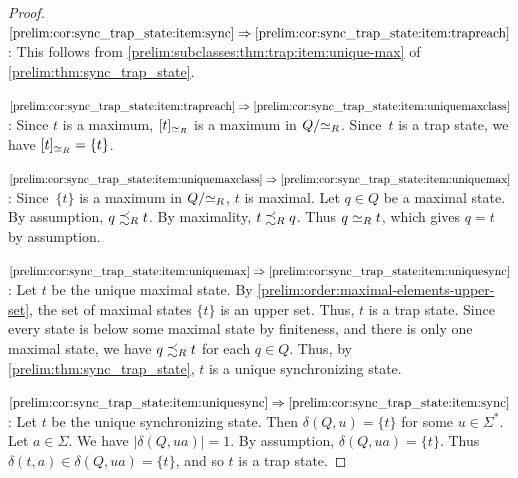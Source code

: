\begin{proof}
$\ref{prelim:cor:sync_trap_state:item:sync}\Rightarrow \ref{prelim:cor:sync_trap_state:item:trapreach}$: This follows from \cref{prelim:subclasses:thm:trap:item:unique-max} of \cref{prelim:thm:sync_trap_state}.

$\ref{prelim:cor:sync_trap_state:item:trapreach}\Rightarrow \ref{prelim:cor:sync_trap_state:item:uniquemaxclass}$: Since $t$ is a maximum, $[t]_{\simeq_R}$ is a maximum in $Q / {\simeq_R}$.
 Since~$t$ is a trap state, we have $[t]_{\simeq_R} = \{t\}$.

$\ref{prelim:cor:sync_trap_state:item:uniquemaxclass}\Rightarrow \ref{prelim:cor:sync_trap_state:item:uniquemax}$: Since~$\{t\}$
is a maximum in $Q / {\simeq_R}$, $t$ is maximal.
Let $q \in Q$ be a maximal state. By assumption, $q \precsim_R t$.
 By maximality, $t \precsim_R q$. Thus $q \simeq_R t$, which gives $q = t$ by assumption.
 
$\ref{prelim:cor:sync_trap_state:item:uniquemax}\Rightarrow \ref{prelim:cor:sync_trap_state:item:uniquesync}$: Let $t$ be the unique maximal state. By \cref{prelim:order:maximal-elements-upper-set},
 the set of maximal states $\{t\}$ is an upper set. Thus, $t$ is a trap state.
 Since every state is below some maximal state by finiteness, and there is only one maximal
 state, we have $q \precsim_R t$ for each $q \in Q$.
 Thus, by \cref{prelim:thm:sync_trap_state}, $t$ is a unique synchronizing state.
 
$\ref{prelim:cor:sync_trap_state:item:uniquesync}\Rightarrow \ref{prelim:cor:sync_trap_state:item:sync}$: Let $t$ be the unique synchronizing state. Then $\delta(Q, u) = \{t\}$
for some $u \in \Sigma^*$. Let $a \in \Sigma$. We have $|\delta(Q, ua)| = 1$.
By assumption, $\delta(Q, ua) = \{t\}$.
Thus $\delta(t, a) \in \delta(Q, ua) = \{t\}$, and so $t$ is a trap state. 
\end{proof}
